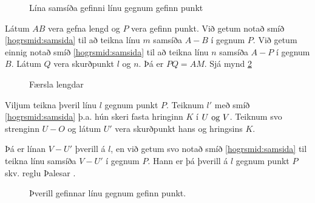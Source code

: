 \begin{frame}
  \begin{figure}[H]
    \centering
    \caption{Lína samsíða gefinni línu gegnum gefinn punkt}
    \label{fig:samsidalinu}
  \end{figure}
\end{frame}
\begin{frame}
  \begin{fylgismid}\label{hogrsmid:faerslalengdar}
    Látum \(AB\) vera gefna lengd og \(P\) vera gefinn punkt.
    Við getum notað smíð \ref{hogrsmid:samsida} til að teikna línu \(m\) samsíða
    \(A-B\) í gegnum \(P\). Við getum einnig notað smíð \ref{hogrsmid:samsida}
    til að teikna línu \(n\) samsíða \(A-P\) í gegnum \(B\). Látum \(Q\)
    vera skurðpunkt \(l\) og \(n\). Þá er \(PQ = AM\).
    Sjá mynd \ref{fig:hogrfaerslalengdar}
  \end{fylgismid}
\end{frame}

\begin{frame}
  \begin{figure}[H]
    \centering
    
    \caption{Færsla lengdar}
    \label{fig:hogrfaerslalengdar}
  \end{figure}
  
\end{frame}

\begin{frame}
  \begin{hogrsmid} \label{hogrsmid:thverill}
    Viljum teikna þveril línu \(l\) gegnum punkt \(P\).
    Teiknum \(l'\) með smíð \ref{hogrsmid:samsida} þ.a. hún skeri
    fasta hringinn \(K\) í \(U \text{ og } V\). Teiknum svo strenginn
    \(U-O\) og látum \(U'\) vera skurðpunkt hans og hringsins \(K\).

    Þá er línan \(V-U'\) þverill á \(l\), en við getum svo notað
    smíð \ref{hogrsmid:samsida} til
    teikna línu samsíða \(V-U'\) í gegnum \(P\).
    Hann er þá þverill á \(l\) gegnum punkt \(P\) skv. reglu
    Þalesar \cite{WikiThales}.
  \end{hogrsmid}
\end{frame}

\begin{frame}
  \begin{figure}[H]
    \centering
    \caption{Þverill gefinnar línu gegnum gefinn punkt.}
    \label{fig:thverilllinu}
  \end{figure}
\end{frame}

